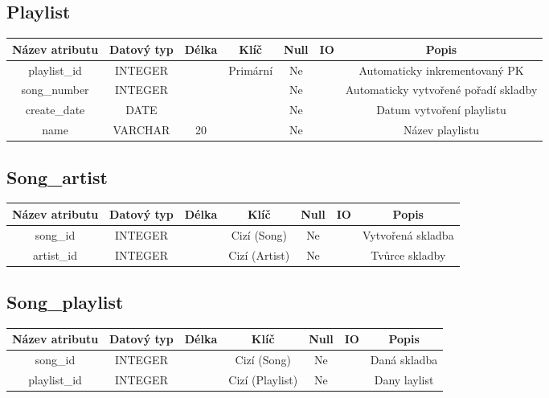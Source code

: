 \subsection*{Playlist}
\begin{tabular}{ |c|c c c c c|c| }
    \hline
    \textbf{Název atributu} & \textbf{Datový typ} & \textbf{Délka} & \textbf{Klíč} & \textbf{Null} & \textbf{IO} & \textbf{Popis}                         \\
    \hline
    playlist\_id            & INTEGER             &                & Primární      & Ne            &             & Automaticky inkrementovaný PK        \\
    song\_number            & INTEGER             &                &               & Ne            &             & Automaticky vytvořené pořadí skladby \\
    create\_date            & DATE                &                &               & Ne            &             & Datum vytvoření playlistu            \\
    name                    & VARCHAR             & 20             &               & Ne            &             & Název playlistu                      \\
    \hline
\end{tabular}
\bigskip

\subsection*{Song\_artist}
\begin{tabular}{ |c|c c c c c|c| }
    \hline
    \textbf{Název atributu} & \textbf{Datový typ} & \textbf{Délka} & \textbf{Klíč} & \textbf{Null} & \textbf{IO} & \textbf{Popis}                         \\
    \hline
    song\_id                & INTEGER             &                & Cizí (Song)   & Ne            &             & Vytvořená skladba \\
    artist\_id              & INTEGER             &                & Cizí (Artist) & Ne            &             & Tvůrce skladby    \\
    \hline
\end{tabular}
\bigskip

\subsection*{Song\_playlist}
\begin{tabular}{ |c|c c c c c|c| }
    \hline
    \textbf{Název atributu} & \textbf{Datový typ} & \textbf{Délka} & \textbf{Klíč}   & \textbf{Null} & \textbf{IO} & \textbf{Popis}                         \\
    \hline
    song\_id                & INTEGER             &                & Cizí (Song)     & Ne            &             & Daná skladba   \\
    playlist\_id            & INTEGER             &                & Cizí (Playlist) & Ne            &             & Dany laylist   \\
    \hline
\end{tabular}
\bigskip

